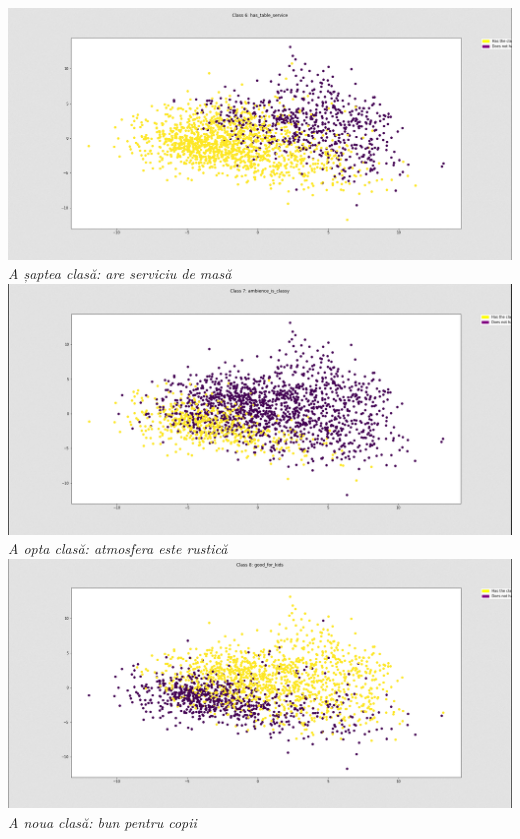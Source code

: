 \begin{center}
\includegraphics[scale=0.4]{class6} \\
\textit{A șaptea clasă: are serviciu de masă} \\

\includegraphics[scale=0.4]{class7} \\
\textit{A opta clasă: atmosfera este rustică} \\

\includegraphics[scale=0.4]{class8} \\
\textit{A noua clasă: bun pentru copii} \\
\end{center}

